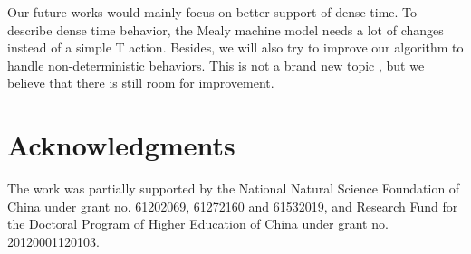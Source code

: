 \documentclass[conference, a4paper]{IEEEtran}
\begin{document}
Our future works would mainly focus on better support of dense time. To describe dense
time behavior, the Mealy machine model needs a lot of changes instead of a simple T action. Besides,
we will also try to improve our algorithm to handle non-deterministic behaviors. This is not a brand
new topic \cite{DBLP:conf/isola/VolpatoT14}, but we believe that there is still room for
improvement.  

\section*{Acknowledgments}
The work was partially supported by the National Natural Science Foundation of China under grant no.
61202069, 61272160 and 61532019, and Research Fund for the Doctoral Program of Higher Education of
China under grant no. 20120001120103.



\end{document}

